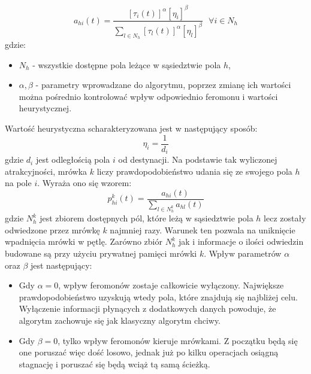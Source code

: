 \documentclass[printmode, openany, oneside, eng]{mgr}
\begin{document}
\begin{equation} \label{eq:atrakcyjnoscAS}
a_{hi}(t) = \frac{[ \tau_{i}(t)]^{\alpha} [\eta_{i}]^{\beta}}{ \sum_{l \in  N_{h} } [ \tau_{l}(t)]^{\alpha} [\eta_{l}]^{\beta}} \ \ \ \forall i \in N_{h}
\end{equation} 
\newline gdzie:
\begin{itemize}
\item $N_{h}$ - wszystkie dostępne pola leżące w sąsiedztwie pola $h$,
\item$\alpha, \beta$ - parametry wprowadzane do algorytmu, poprzez zmianę ich wartości można pośrednio kontrolować wpływ odpowiednio feromonu i wartości heurystycznej.
\end{itemize}
Wartość heurystyczna scharakteryzowana jest w następujący sposób:
\newline
\begin{equation}
\eta_{i} = \frac{1}{d_i}
\end{equation} 
gdzie $d_i$ jest odległością pola $i$ od destynacji.
\newline Na podstawie tak wyliczonej atrakcyjności, mrówka $k$ liczy prawdopodobieństwo udania się ze swojego pola $h$ na pole $i$. Wyraża ono się wzorem:
\newline
\begin{equation} \label{eq:prawAS}
p^k_{hi}(t) = \frac{ a_{hi}(t) }{ \sum_{l \in  N^k_{h}  } a_{hl}(t)  }
\end{equation} 
\newline gdzie $ N^k_{h}$ jest zbiorem dostępnych pól, które leżą w sąsiedztwie pola $h$ lecz zostały odwiedzone przez mrówkę $k$ najmniej razy. Warunek ten pozwala na uniknięcie wpadnięcia mrówki w pętlę. Zarówno zbiór $ N^k_{h}$ jak i informacje o ilości odwiedzin budowane są przy użyciu prywatnej pamięci mrówki $k$.
\newline Wpływ parametrów $\alpha$ oraz $\beta$ jest następujący:
\begin{itemize}
\item Gdy $\alpha = 0$, wpływ feromonów zostaje całkowicie wyłączony. Największe prawdopodobieństwo uzyskują wtedy pola, które znajdują się najbliżej celu. Wyłączenie informacji płynących z dodatkowych danych powoduje, że algorytm zachowuje się jak klasyczny algorytm chciwy. 
\item Gdy $\beta = 0$, tylko wpływ feromonów kieruje mrówkami. Z początku będą się one poruszać więc dość losowo, jednak już po kilku operacjach osiągną stagnację i poruszać się będą wciąż tą samą ścieżką.
\end{itemize}
\end{document}
